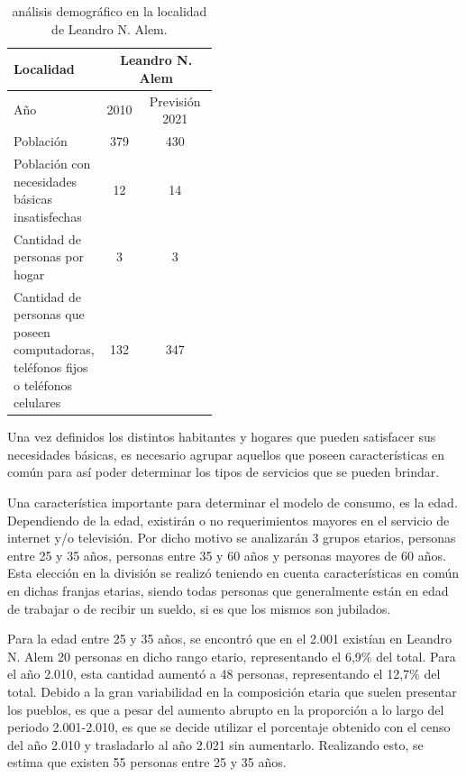\documentclass[11pt,a4paper]{article}
\begin{document}
\begin{table}[htbp]
  \centering
    \begin{tabular}{|p{0.45\linewidth}|c|c|}
    \hline
    Localidad & \multicolumn{2}{|c|}{Leandro N. Alem} \\
    \hline
    Año  & 2010 & Previsión 2021 \\
    \hline
    Población & 379  & 430 \\
    \hline
    Población con necesidades básicas insatisfechas & 12   & 14 \\
    \hline
    Cantidad de personas por hogar & 3    & 3 \\
    \hline
    Cantidad de personas que poseen computadoras, teléfonos fijos o teléfonos celulares & 132  & 347 \\
    \hline
    \end{tabular}%
    \caption{análisis demográfico en la localidad de Leandro N. Alem.}
  \label{tab:prediccion_alem}%
\end{table}%


Una vez definidos los distintos habitantes y hogares que pueden satisfacer sus necesidades básicas, es necesario agrupar aquellos que poseen características en común para así poder determinar los tipos de servicios que se pueden brindar.

Una característica importante para determinar el modelo de consumo, es la edad.
Dependiendo de la edad, existirán o no requerimientos mayores en el servicio de internet y/o televisión.
Por dicho motivo se analizarán 3 grupos etarios, personas entre 25 y 35 años, personas entre 35 y 60 años y personas mayores de 60 años. 
Esta elección en la división se realizó teniendo en cuenta características en común en dichas franjas etarias, siendo todas personas que generalmente están en edad de trabajar o de recibir un sueldo, si es que los mismos son jubilados.

Para la edad entre 25 y 35 años, se encontró que en el 2.001 existían en Leandro N. Alem 20 personas en dicho rango etario, representando el 6,9$\%$ del total. 
Para el año 2.010, esta cantidad aumentó a 48 personas, representando el 12,7$\%$ del total.
Debido a la gran variabilidad en la composición etaria que suelen presentar los pueblos, es que a pesar del aumento abrupto en la proporción a lo largo del periodo 2.001-2.010, es que se decide utilizar el porcentaje obtenido con el censo del año 2.010 y trasladarlo al año 2.021 sin aumentarlo.
Realizando esto, se estima que existen 55 personas entre 25 y 35 años.
\end{document}
